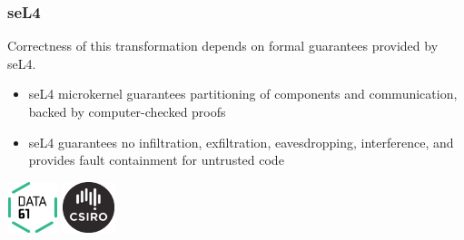\documentclass{beamer}
\begin{document}
\begin{frame}\frametitle{seL4}

Correctness of this transformation depends on formal guarantees provided by seL4.

\begin{itemize}
\item seL4 microkernel guarantees partitioning of components and
  communication, backed by computer-checked proofs

\item seL4 guarantees no infiltration, exfiltration, eavesdropping,
  interference, and provides fault containment for untrusted code

\end{itemize}

\vspace*{5mm}
\hspace*{10mm}\includegraphics[width=15mm,height=15mm]{data61-logo.png}
\hspace*{10mm}\includegraphics[width=15mm,height=15mm]{csiro--black.png}

\end{frame}
\end{document}
